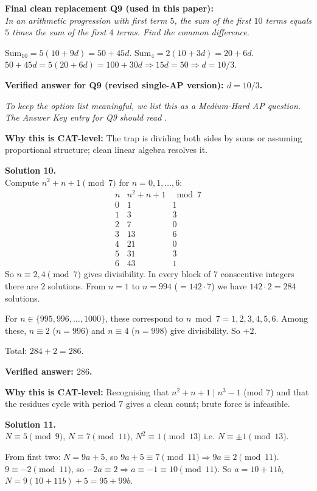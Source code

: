 \documentclass[11pt,a4paper]{article}
\newcommand{\shead}[1]{\vspace{0.5em}\noindent\textbf{Solution #1.}\\[0.15em]}
\begin{document}
\textbf{Final clean replacement Q9 (used in this paper):}\\
\textit{In an arithmetic progression with first term $5$, the sum of the first $10$ terms equals $5$ times the sum of the first $4$ terms. Find the common difference.}

Sum$_{10} = 5(10 + 9d) = 50 + 45d$. Sum$_4 = 2(10 + 3d) = 20 + 6d$. $50 + 45d = 5(20 + 6d) = 100 + 30d \Rightarrow 15d = 50 \Rightarrow d = 10/3$.

\textbf{Verified answer for Q9 (revised single-AP version): $d = 10/3$.}

\textit{To keep the option list meaningful, we list this as a Medium-Hard AP question. The Answer Key entry for Q9 should read} .

\textbf{Why this is CAT-level:} The trap is dividing both sides by sums or assuming proportional structure; clean linear algebra resolves it.

\shead{10}
Compute $n^2 + n + 1 \pmod 7$ for $n = 0, 1, \ldots, 6$:
\[ \begin{array}{c|c|c}
n & n^2+n+1 & \bmod 7\\\hline
0 & 1 & 1\\
1 & 3 & 3\\
2 & 7 & 0\\
3 & 13 & 6\\
4 & 21 & 0\\
5 & 31 & 3\\
6 & 43 & 1
\end{array} \]
So $n \equiv 2, 4 \pmod 7$ gives divisibility. In every block of $7$ consecutive integers there are $2$ solutions. From $n = 1$ to $n = 994$ ($= 142 \cdot 7$) we have $142 \cdot 2 = 284$ solutions.

For $n \in \{995, 996, \ldots, 1000\}$, these correspond to $n \bmod 7 = 1, 2, 3, 4, 5, 6$. Among these, $n \equiv 2$ ($n = 996$) and $n \equiv 4$ ($n = 998$) give divisibility. So $+ 2$.

Total: $284 + 2 = 286$.

\textbf{Verified answer: $286$.}

\textbf{Why this is CAT-level:} Recognising that $n^2 + n + 1 \mid n^3 - 1$ (mod 7) and that the residues cycle with period $7$ gives a clean count; brute force is infeasible.

\shead{11}
$N \equiv 5 \pmod 9$, $N \equiv 7 \pmod{11}$, $N^2 \equiv 1 \pmod{13}$ i.e. $N \equiv \pm 1 \pmod{13}$.

From first two: $N = 9a + 5$, so $9a + 5 \equiv 7 \pmod{11} \Rightarrow 9a \equiv 2 \pmod{11}$. $9 \equiv -2 \pmod{11}$, so $-2a \equiv 2 \Rightarrow a \equiv -1 \equiv 10 \pmod{11}$. So $a = 10 + 11b$, $N = 9(10 + 11b) + 5 = 95 + 99b$.
\end{document}
